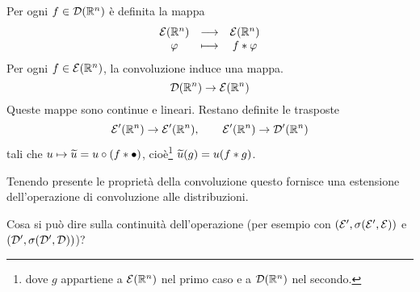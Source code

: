 

















\begin{exercise}
Per ogni $f\in \mathcal{D}(\mathbb{R}^n)$ \`e definita la mappa
\[\begin{array}{ccc} {\mathcal{E}(\mathbb{R}^n)} & \longrightarrow & {\mathcal{E}(\mathbb{R}^n)}\\ {\varphi} & \longmapsto & {f\ast\varphi} \end{array}\]
Per ogni $f\in \mathcal{E}(\mathbb{R}^n)$, la convoluzione induce una mappa.
\[\mathcal{D}(\mathbb{R}^n)\to \mathcal{E}(\mathbb{R}^n)\]
Queste mappe sono continue e lineari. Restano definite le trasposte
\[\mathcal{E}'(\mathbb{R}^n)\to\mathcal{E}'(\mathbb{R}^n),\qquad \mathcal{E}'(\mathbb{R}^n)\to \mathcal{D}'(\mathbb{R}^n)\]
tali che $u\mapsto \widetilde{u}=u\circ (f\ast\bullet)$, cio\`e\footnote{dove $g$ appartiene a $\mathcal{E}(\mathbb{R}^n)$ nel primo caso e a $\mathcal{D}(\mathbb{R}^n)$ nel secondo.} $\widetilde{u}(g)=u(f\ast g)$.

Tenendo presente le propriet\`a della convoluzione questo fornisce una estensione dell'operazione di convoluzione alle distribuzioni.

Cosa si pu\`o dire sulla continuit\`a dell'operazione (per esempio con $(\mathcal{E}',\sigma(\mathcal{E}',\mathcal{E}))$ e $(\mathcal{D}',\sigma(\mathcal{D}',\mathcal{D}))$)?
\end{exercise}













